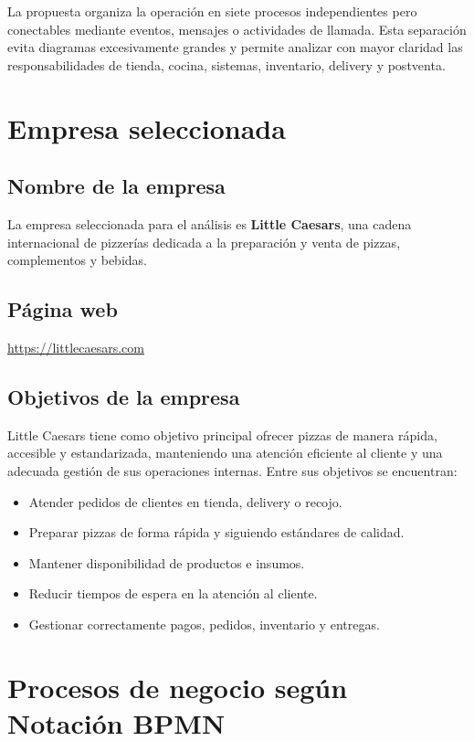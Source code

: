 \documentclass[a4paper,12pt]{article}
\begin{document}
La propuesta organiza la operación en siete procesos independientes pero conectables mediante eventos, mensajes o actividades de llamada. Esta separación evita diagramas excesivamente grandes y permite analizar con mayor claridad las responsabilidades de tienda, cocina, sistemas, inventario, delivery y postventa.

\section*{Empresa seleccionada}

\subsection*{Nombre de la empresa}

La empresa seleccionada para el análisis es \textbf{Little Caesars}, una cadena internacional de pizzerías dedicada a la preparación y venta de pizzas, complementos y bebidas.

\subsection*{Página web}

\url{https://littlecaesars.com}

\subsection*{Objetivos de la empresa}

Little Caesars tiene como objetivo principal ofrecer pizzas de manera rápida, accesible y estandarizada, manteniendo una atención eficiente al cliente y una adecuada gestión de sus operaciones internas. Entre sus objetivos se encuentran:

\begin{itemize}
    \item Atender pedidos de clientes en tienda, delivery o recojo.
    \item Preparar pizzas de forma rápida y siguiendo estándares de calidad.
    \item Mantener disponibilidad de productos e insumos.
    \item Reducir tiempos de espera en la atención al cliente.
    \item Gestionar correctamente pagos, pedidos, inventario y entregas.
\end{itemize}

\section*{Procesos de negocio según Notación BPMN}
\end{document}
